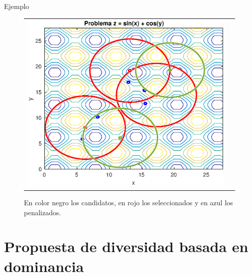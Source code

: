 \documentclass{beamer}
\begin{document}
\begin{frame}{Ejemplo}
\begin{figure}[H]
  \centering
  \begin{tabular}{c c}
   \includegraphics[scale=0.6]{6.eps} 
  \end{tabular}
  \caption{\scriptsize En color negro los candidatos, en rojo los seleccionados y en azul los penalizados.}
\end{figure}
\end{frame}




\section{Propuesta de diversidad basada en dominancia}
\end{document}
